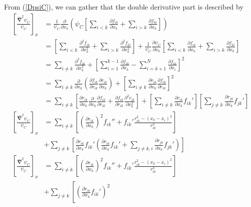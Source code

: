 \documentclass[twocolumns, a4paper,11pt,fleqn]{extarticle}
\newcommand{\eq}[1]{{\small\begin{align*}#1\end{align*}}}
\newcommand{\op}[1]{\hat{#1}}
\begin{document}
From (\ref{DpsiC}), we can gather that the double derivative part is described by
\eq{
  \left[\frac{\mathbf{\op\nabla}^2 \psi_C}{\psi_C}\right]_x
  &=\frac{1}{\psi_C}\frac{\partial}{\partial x_k}\left(\psi_C
      \left[\sum_{i<k} \frac{\partial f_{ik}}{\partial x_k}
      +\sum_{i>k} \frac{\partial f_{ki}}{\partial x_k} \right]\right)\\
  &=\left[\sum_{i<k} \frac{\partial^2 f_{ik}}{\partial x_k^2}
      +\sum_{i>k} \frac{\partial^2 f_{ki}}{\partial x_k^2} \right]
      +\frac{1}{\psi_C}\frac{\partial \psi_C}{\partial x_k}
      \left[\sum_{i<k} \frac{\partial f_{ik}}{\partial x_k}
      +\sum_{i>k} \frac{\partial f_{ki}}{\partial x_k} \right]\\
  &=\sum_{i\neq k}\frac{\partial^2 f_{ik}}{\partial x_k^2} +
    \left[\sum_{i=1}^{k-1}\frac{\partial f_{ik}}{\partial x_k} -
    \sum_{i=k+1}^{N}\frac{\partial f_{ki}}{\partial x_i}
    \right]^2\\
  &=\sum_{i\neq k}
    \frac{\partial}{\partial x_k}
    \left(
    \frac{\partial f_{ik}}{\partial r_{ik}}
    \frac{\partial r_{ik}}{\partial x_k}
    \right)+
    \left[\sum_{i\neq k}\frac{\partial r_{ik}}{\partial x_k}
    \frac{\partial f_{ik}}{\partial r_{ik}}
    \right]^2\\
  &=\sum_{i\neq k}
    \left[
    \frac{\partial r_{ik}}{\partial x_k}
    \frac{\partial}{\partial x_k}
    \frac{\partial f_{ik}}{\partial r_{ik}}
    +
    \frac{\partial f_{ik}}{\partial r_{ik}}
    \frac{\partial^2 r_{ik}}{\partial x_k^2}\right]
    +
    \left[\sum_{i\neq k}\frac{\partial r_{ik}}{\partial x_k} f_{ik}'
    \right]
    \left[\sum_{j\neq k}\frac{\partial r_{jk}}{\partial x_k} f_{jk}'
    \right]\\
  \left[\frac{\mathbf{\op\nabla}^2 \psi_C}{\psi_C}\right]_x
  &=\sum_{i\neq k}
    \left[
    \left(
    \frac{\partial r_{ik}}{\partial x_k}
    \right)^2
    f_{ik}''
    +
    f_{ik}'
    \frac{r_{ik}^2 - (x_k-x_i)^2}{r_{ik}^3}\right]
    \\&+
    \sum_{j\neq k}\left[\frac{\partial r_{ik}}{\partial x_k} f_{ik}'\left(
    \frac{\partial r_{ik}}{\partial x_k} f_{ik}'+
    \sum_{j\neq k,i} \frac{\partial r_{jk}}{\partial x_k} f_{jk}'\right)
    \right]\\
  \left[\frac{\mathbf{\op\nabla}^2 \psi_C}{\psi_C}\right]_x
  &=\sum_{i\neq k}
    \left[
    \left(
    \frac{\partial r_{ik}}{\partial x_k}
    \right)^2
    f_{ik}''
    +
    f_{ik}'
    \frac{r_{ik}^2 - (x_k-x_i)^2}{r_{ik}^3}\right]
    \\&+
    \sum_{j\neq k}\left[\left(\frac{\partial r_{ik}}{\partial x_k} f_{ik}'\right)^2
}
\end{document}
